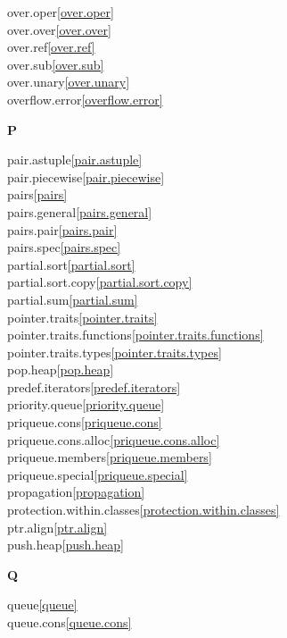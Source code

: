 \begin{multicols}{2}
over.oper\quad\ref{over.oper}\\
over.over\quad\ref{over.over}\\
over.ref\quad\ref{over.ref}\\
over.sub\quad\ref{over.sub}\\
over.unary\quad\ref{over.unary}\\
overflow.error\quad\ref{overflow.error}\\
\par \textbf{P}\par
pair.astuple\quad\ref{pair.astuple}\\
pair.piecewise\quad\ref{pair.piecewise}\\
pairs\quad\ref{pairs}\\
pairs.general\quad\ref{pairs.general}\\
pairs.pair\quad\ref{pairs.pair}\\
pairs.spec\quad\ref{pairs.spec}\\
partial.sort\quad\ref{partial.sort}\\
partial.sort.copy\quad\ref{partial.sort.copy}\\
partial.sum\quad\ref{partial.sum}\\
pointer.traits\quad\ref{pointer.traits}\\
pointer.traits.functions\quad\ref{pointer.traits.functions}\\
pointer.traits.types\quad\ref{pointer.traits.types}\\
pop.heap\quad\ref{pop.heap}\\
predef.iterators\quad\ref{predef.iterators}\\
priority.queue\quad\ref{priority.queue}\\
priqueue.cons\quad\ref{priqueue.cons}\\
priqueue.cons.alloc\quad\ref{priqueue.cons.alloc}\\
priqueue.members\quad\ref{priqueue.members}\\
priqueue.special\quad\ref{priqueue.special}\\
propagation\quad\ref{propagation}\\
protection.within.classes\quad\ref{protection.within.classes}\\
ptr.align\quad\ref{ptr.align}\\
push.heap\quad\ref{push.heap}\\
\par \textbf{Q}\par
queue\quad\ref{queue}\\
queue.cons\quad\ref{queue.cons}\\

\end{multicols}

